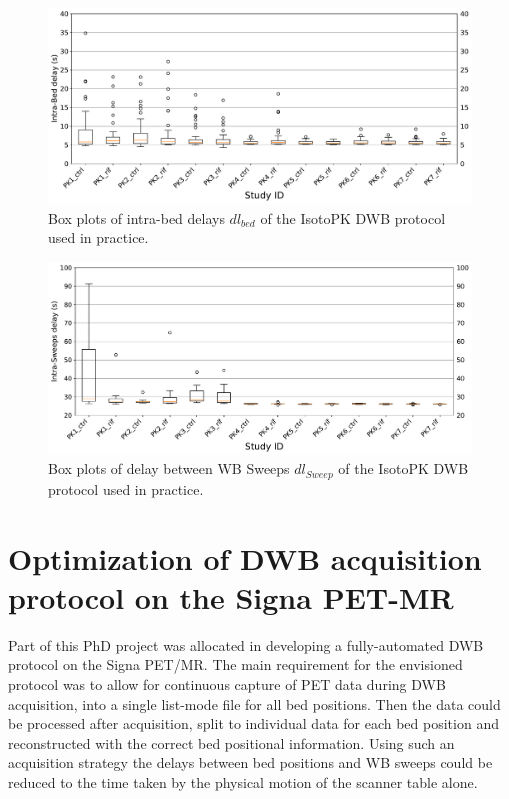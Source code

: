 %
%
%
\begin{figure} [ht!]
\centering
\includegraphics[scale=0.5,angle=0]{3_Results/3_1_DWB_Optimization/figures/3_1_BoxPlots_DTBeds.pdf}
\caption{Box plots of intra-bed delays $dl_{bed}$ of the IsotoPK DWB protocol used in practice.} 
\label{fig3_1:BoxPlots_beds}
\end{figure}
%
\begin{figure} [ht!]
\centering
\includegraphics[scale=0.5,angle=0]{3_Results/3_1_DWB_Optimization/figures/3_1_BoxPlots_DTSweeps.pdf}
\caption{Box plots of delay between WB Sweeps $dl_{Sweep}$ of the IsotoPK DWB protocol used in practice.}
\label{fig3_1:BoxPlots_sweeps}
\end{figure}
%
%
%
\section{Optimization of DWB acquisition protocol on the Signa PET-MR}
Part of this PhD project was allocated in developing a fully-automated DWB protocol on the Signa PET/MR. 
The main requirement for the envisioned protocol was to allow for continuous capture of PET data during DWB acquisition, into a single list-mode file for all bed positions. Then the data could be processed after acquisition, split to individual data for each bed position and reconstructed with the correct bed positional information. Using such an acquisition strategy the delays between bed positions and WB sweeps could be reduced to the time taken by the physical motion of the scanner table alone. 

